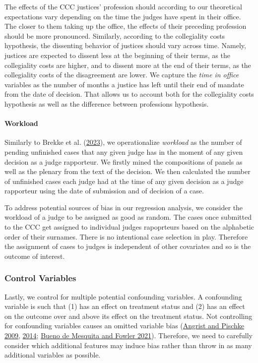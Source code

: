 \documentclass[
  11pt,
]{article}
\begin{document}
The effects of the CCC justices' profession should according to our
theoretical expectations vary depending on the time the judges have
spent in their office. The closer to them taking up the office, the
effects of their preceding profession should be more pronounced.
Similarly, according to the collegiality costs hypothesis, the
dissenting behavior of justices should vary across time. Namely,
justices are expected to dissent less at the beginning of their terms,
as the collegiality costs are higher, and to dissent more at the end of
their terms, as the collegiality costs of the disagreement are lower. We
capture the \emph{time in office} variables as the number of months a
justice has left until their end of mandate from the date of decision.
That allows us to account both for the collegiality costs hypothesis as
well as the difference between professions hypothesis.

\hypertarget{workload}{%
\paragraph{Workload}\label{workload}}

Similarly to Brekke et al.
(\protect\hyperlink{ref-brekkeThatOrderHow2023}{2023}), we
operationalize \emph{workload} as the number of pending unfinished cases
that any given judge has in the moment of any given decision as a judge
rapporteur. We firstly mined the compositions of panels as well as the
plenary from the text of the decision. We then calculated the number of
unfinished cases each judge had at the time of any given decision as a
judge rapporteur using the date of submission and of decision of a case.

To address potential sources of bias in our regression analysis, we
consider the workload of a judge to be assigned as good as random. The
cases once submitted to the CCC get assigned to individual judges
rapoprteurs based on the alphabetic order of their surnames. There is no
intentional case selection in play. Therefore the assignment of cases to
judges is independent of other covariates and so is the outcome of
interest.

\hypertarget{control-variables}{%
\subsubsection{Control Variables}\label{control-variables}}

Lastly, we control for multiple potential confounding variables. A
confounding variable is such that (1) has an effect on treatment status
and (2) has an effect on the outcome over and above its effect on the
treatment status. Not controlling for confounding variables causes an
omitted variable bias
(\protect\hyperlink{ref-angristMostlyHarmlessEconometrics2009}{Angrist
and Pischke 2009},
\protect\hyperlink{ref-angristMasteringMetricsPath2014}{2014};
\protect\hyperlink{ref-buenodemesquitaThinkingClearlyData2021}{Bueno de
Mesquita and Fowler 2021}). Therefore, we need to carefully consider
which additional features may induce bias rather than throw in as many
additional variables as possible.
\end{document}
